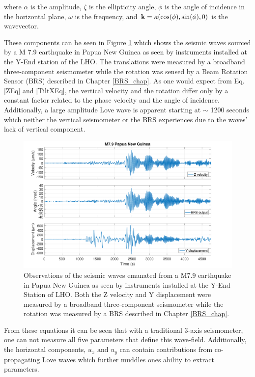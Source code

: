 \documentclass [12pt, proquest]{uwthesis}[2019]
\begin{document}
where $\alpha$ is the amplitude, $\zeta$ is the ellipticity angle, $\phi$ is the angle of incidence in the horizontal plane, $\omega$ is the frequency, and $\bf{k}=\kappa (\cos(\phi),\sin(\phi),\text{0})$ is the wavevector.

These components can be seen in Figure \ref{Earthquake} which shows the seismic waves sourced by a M 7.9 earthquake in Papua New Guinea as seen by instruments installed at the Y-End station of the LHO. The translations were measured by a broadband three-component seismometer while the rotation was sensed by a Beam Rotation Sensor (BRS) described in Chapter \ref{BRS_chap}. As one would expect from Eq. \ref{ZEq} and \ref{TiltXEq}, the vertical velocity and the rotation differ only by a constant factor related to the phase velocity and the angle of incidence. Additionally, a large amplitude Love wave is apparent starting at $\sim$ 1200 seconds which neither the vertical seismometer or the BRS experiences due to the waves' lack of vertical component.

\begin{figure}%
\begin{center}
\includegraphics[width=\textwidth]{PNGTimeSeries.pdf}
\caption{Observations of the seismic waves emanated from a M7.9 earthquake in Papua New Guinea as seen by instruments installed at the Y-End Station of LHO. \cite{tiltSeismology} Both the Z velocity and Y displacement were measured by a broadband three-component seismometer while the rotation was measured by a BRS described in Chapter \ref{BRS_chap}. }
\label{Earthquake}
\end{center}
\end{figure}

From these equations it can be seen that with a traditional 3-axis seismometer, one can not measure all five parameters that define this wave-field. Additionally, the horizontal components, $u_x\text{ and }u_y$ can contain contributions from co-propagating Love waves which further muddles ones ability to extract parameters. 
\end{document}
